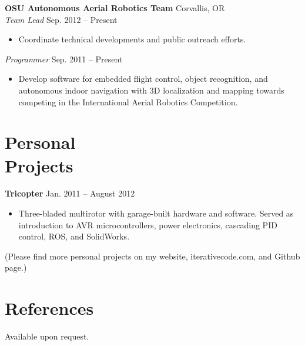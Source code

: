 \documentclass[10pt,letterpaper,margin]{res}
\begin{document}
\begin{resume}
{\bf OSU Autonomous Aerial Robotics Team} \hfill {\color{lightgray} Corvallis, OR} \\
{\it Team Lead} \hfill {\color{lightgray} Sep. 2012 -- Present}\vspace{0.2em}

\begin{itemize}
	\item Coordinate technical developments and public outreach efforts.
\end{itemize}

{\it Programmer} \hfill {\color{lightgray} Sep. 2011 -- Present}\vspace{0.2em}

\begin{itemize}
	\item Develop software for embedded flight control, object recognition, and
		autonomous indoor navigation with 3D localization and mapping towards
		competing in the International Aerial Robotics Competition.
\end{itemize}



\section{Personal \\ Projects}

{\bf Tricopter} \hfill {\color{lightgray} Jan. 2011 -- August 2012}\vspace{0.2em}

\begin{itemize}
	\item Three-bladed multirotor with garage-built hardware and software.
		Served as introduction to AVR microcontrollers, power electronics,
		cascading PID control, ROS, and SolidWorks.
\end{itemize}

{\footnotesize (Please find more personal projects on my website, iterativecode.com, and Github page.)}



\section{References}

Available upon request.

\end{resume}
\end{document}
